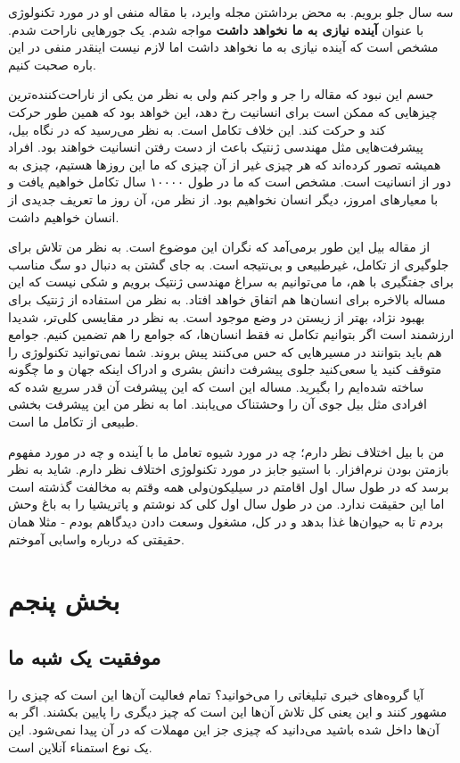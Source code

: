 سه سال جلو برویم. به محض برداشتن مجله وایرد، با مقاله منفی او در مورد تکنولوژی با عنوان
\textbf{آینده نیازی به ما نخواهد داشت} مواجه شدم. یک جورهایی ناراحت
  شدم. مشخص است که آینده نیازی به ما نخواهد داشت اما لازم نیست اینقدر
  منفی در این باره صحبت کنیم.

حسم این نبود که مقاله را جر و واجر کنم ولی به نظر من یکی از
ناراحت‌کننده‌ترین چیزهایی که ممکن است برای انسانیت رخ دهد، این خواهد بود
که همین طور حرکت کند و حرکت کند. این خلاف تکامل است. به نظر می‌رسید که
در نگاه بیل، پیشرفت‌هایی مثل مهندسی ژنتیک باعث از دست رفتن انسانیت
خواهند بود. افراد همیشه تصور کرده‌اند که هر چیزی غیر از آن چیزی که ما
این روزها هستیم، چیزی به دور از انسانیت است. مشخص است که ما در طول
۱۰۰۰۰ سال تکامل خواهیم یافت و با معیارهای امروز، دیگر انسان نخواهیم
بود. از نظر من، آن‌ روز ما تعریف جدیدی از انسان خواهیم داشت.

از مقاله بیل این طور برمی‌آمد که نگران این موضوع است. به نظر من تلاش
برای جلوگیری از تکامل، غیرطبیعی و بی‌نتیجه است. به جای گشتن به دنبال دو
سگ مناسب برای جفتگیری با هم، ما می‌توانیم به سراغ مهندسی ژنتیک برویم و
شکی نیست که این مساله بالاخره برای انسان‌ها هم اتفاق خواهد افتاد. به
نظر من استفاده از ژنتیک برای بهبود نژاد، بهتر از زیستن در وضع موجود
است. به نظر در مقایسی کلی‌تر، شدیدا ارزشمند است اگر بتوانیم تکامل نه
فقط انسان‌ها، که جوامع را هم تضمین کنیم. جوامع هم باید بتوانند در
مسیرهایی که حس می‌کنند پیش بروند. شما نمی‌توانید تکنولوژی را متوقف کنید
یا سعی‌کنید جلوی پیشرفت دانش بشری و ادراک اینکه جهان و ما چگونه ساخته
شده‌ایم را بگیرید. مساله این است که این پیشرفت آن قدر سریع شده که
افرادی مثل بیل جوی آن را وحشتناک می‌یابند. اما به نظر من این پیشرفت
بخشی طبیعی از تکامل ما است.

من با بیل اختلاف نظر دارم؛ چه در مورد شیوه تعامل ما با آینده و چه در
مورد مفهوم بازمتن بودن نرم‌افزار. با استیو جابز در مورد تکنولوژی اختلاف
نظر دارم. شاید به نظر برسد که در طول سال اول اقامتم در سیلیکون‌ولی همه
وقتم به مخالفت گذشته است اما این حقیقت ندارد. من در طول سال اول کلی کد
نوشتم و پاتریشیا را به باغ وحش بردم تا به حیوان‌ها غذا بدهد و در کل،
مشغول وسعت دادن دیدگاهم بودم - مثلا همان حقیقتی که درباره واسابی
آموختم.

\section{بخش پنجم}
\subsection*{موفقیت یک شبه ما}
آیا گروه‌های خبری تبلیغاتی را می‌خوانید؟ تمام فعالیت آن‌ها این است که
چیزی را مشهور کنند و این یعنی کل تلاش آن‌ها این است که چیز دیگری را
پایین بکشند. اگر به آن‌ها داخل شده باشید می‌دانید که چیزی جز این مهملات
که  در آن پیدا نمی‌شود. این یک
نوع استمناء آنلاین است.


